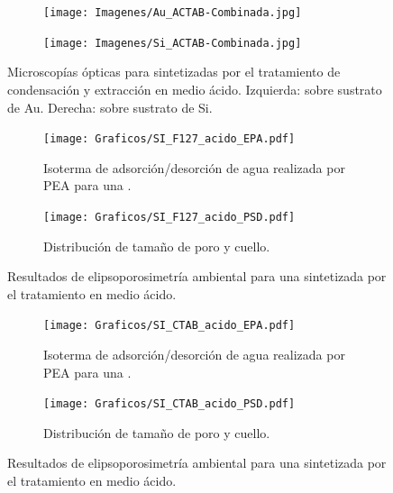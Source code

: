    			\begin{figure}
 	   	    \begin{subfigure}{0.495\textwidth}
	       	\texttt{[image: Imagenes/Au\_ACTAB-Combinada.jpg]}
	   		\end{subfigure}
	   		\begin{subfigure}{0.495\textwidth}
	   	    \texttt{[image: Imagenes/Si\_ACTAB-Combinada.jpg]}
	   		\end{subfigure}
			 \caption[Microscopía óptica \pdmC tratamiento en medio ácido.]{Microscopías ópticas para \pdmC\space sintetizadas por el tratamiento de condensación y extracción en medio ácido. Izquierda: sobre sustrato de Au. Derecha: sobre sustrato de Si.}
			 \label{fig:Microscopia_CTAB_acido}	
		     \end{figure}
   	

		    \begin{figure}
		  	\begin{subfigure}{0.495\textwidth}
		  	\texttt{[image: Graficos/SI\_F127\_acido\_EPA.pdf]}
			\caption{Isoterma de adsorción/desorción de agua realizada por PEA para una \pdmF.}
			\label{fig:F127_acido_EPA}
			\end{subfigure}
			\begin{subfigure}{0.495\textwidth}
		  	\texttt{[image: Graficos/SI\_F127\_acido\_PSD.pdf]}
			\caption{Distribución de tamaño de poro y cuello.\\ }
			\label{fig:F127_acido_PSD}
			\end{subfigure}
			\caption[Elipsoporosimetría \pdmF\space tratamiento ácido.]{Resultados de elipsoporosimetría ambiental para una \pdmF\space sintetizada por el tratamiento en medio ácido.}
			\end{figure}     

		
			\begin{figure}
		  	\begin{subfigure}{0.495\textwidth}
		  	\texttt{[image: Graficos/SI\_CTAB\_acido\_EPA.pdf]}
			\caption[Elipsoporsimetría \pdmC\space tratamiento ácido.]{Isoterma de adsorción/desorción de agua realizada por PEA para una \pdmC.}
			\label{fig:CTAB_acido_EPA}
			\end{subfigure}
			\begin{subfigure}{0.495\textwidth}
		  	\texttt{[image: Graficos/SI\_CTAB\_acido\_PSD.pdf]}
			\caption{Distribución de tamaño de poro y cuello.\\ }
			\label{fig:CTAB_acido_PSD}
			\end{subfigure}
			\caption[Elipsoporosimetría \pdmC\space tratamiento ácido.]{Resultados de elipsoporosimetría ambiental para una \pdmC\space sintetizada por el tratamiento en medio ácido.}
			\end{figure}

